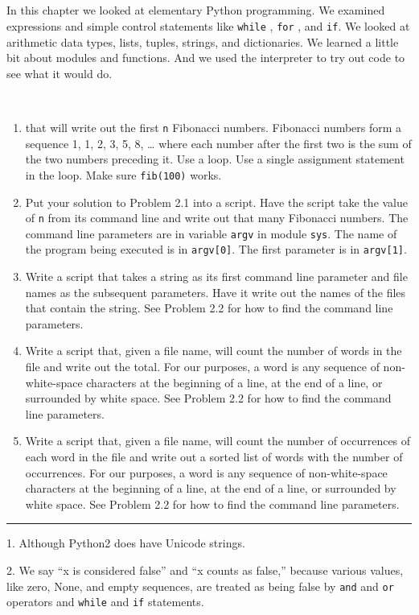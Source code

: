 \subsection[Summary]{}

In this chapter we looked at
elementary Python programming. We examined expressions and simple
control statements like \texttt{while} , \texttt{for} , and \texttt{if}. We
looked at arithmetic data types, lists, tuples, strings, and
dictionaries. We learned a little bit about modules and functions. And
we used the interpreter to try out code to see what it would do.

~

\begin{enumerate}

\item
  
  that will write out the first \texttt{n} Fibonacci numbers. Fibonacci
  numbers form a sequence 1, 1, 2, 3, 5, 8, \ldots{} where each number
  after the first two is the sum of the two numbers preceding it. Use a
  loop. Use a single assignment statement in the loop. Make sure
  \texttt{fib(100)} works.
\item
  Put your solution to Problem 2.1
  into a script. Have the script take the value of \texttt{n} from its
  command line and write out that many Fibonacci numbers. The command
  line parameters are in variable \texttt{argv} in module \texttt{sys}. The
  name of the program being executed is in \texttt{argv{[}0{]}}. The
  first parameter is in \texttt{argv{[}1{]}}.
\item
  Write a script that takes a
  string as its first command line parameter and file names as the
  subsequent parameters. Have it write out the names of the files that
  contain the string. See Problem 2.2 for how to find the command line
  parameters.
\item
  Write a script that, given a
  file name, will count the number of words in the file and write out
  the total. For our purposes, a word is any sequence of non-white-space
  characters at the beginning of a line, at the end of a line, or
  surrounded by white space. See Problem 2.2 for how to find the command
  line parameters.
\item
  Write a script that, given a
  file name, will count the number of occurrences of each word in the
  file and write out a sorted list of words with the number of
  occurrences. For our purposes, a word is any sequence of
  non-white-space characters at the beginning of a line, at the end of a
  line, or surrounded by white space. See Problem 2.2 for how to find
  the command line parameters.
\end{enumerate}

\begin{center}\rule{0.5\linewidth}{\linethickness}\end{center}

{ 1.} Although Python2 does have
Unicode strings.

{ 2.} We say ``x is considered
false'' and ``x counts as false,'' because various values, like zero,
None, and empty sequences, are treated as being false by \texttt{and} and
\texttt{or} operators and \texttt{while} and \texttt{if} statements.
